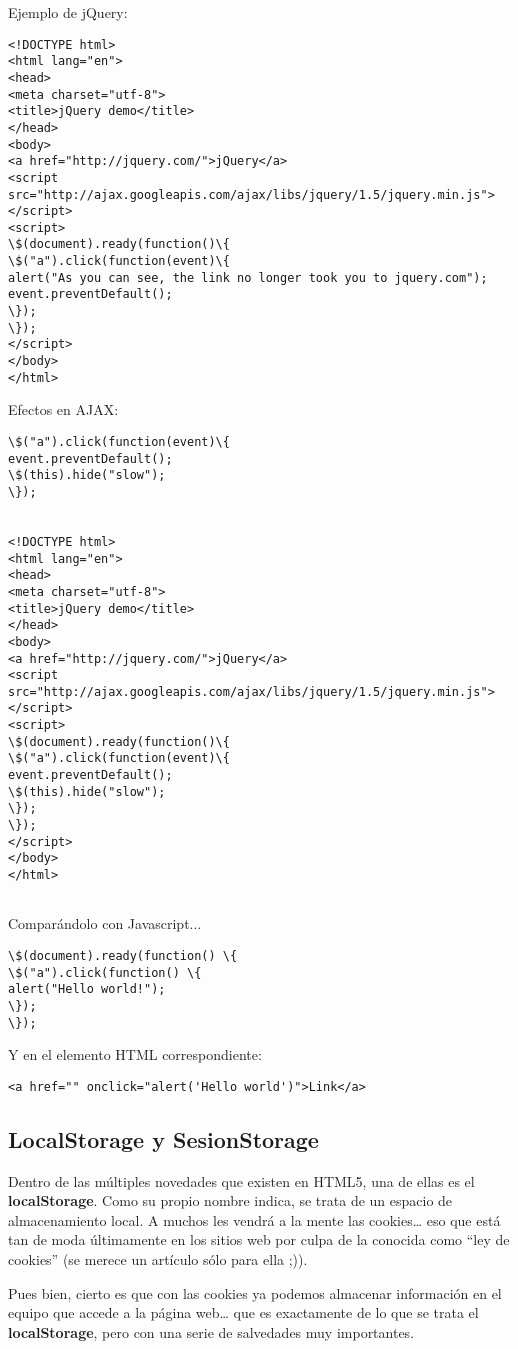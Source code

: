 \documentclass{apuntes}
\begin{document}
Ejemplo de jQuery:

\begin{verbatim}
<!DOCTYPE html>
<html lang="en">
<head>
<meta charset="utf-8">
<title>jQuery demo</title>
</head>
<body>
<a href="http://jquery.com/">jQuery</a>
<script src="http://ajax.googleapis.com/ajax/libs/jquery/1.5/jquery.min.js"></script>
<script>
\$(document).ready(function()\{
\$("a").click(function(event)\{
alert("As you can see, the link no longer took you to jquery.com");
event.preventDefault();
\});
\});
</script>
</body>
</html>
\end{verbatim}

Efectos en AJAX:
\begin{verbatim}
\$("a").click(function(event)\{
event.preventDefault();
\$(this).hide("slow");
\});


<!DOCTYPE html>
<html lang="en">
<head>
<meta charset="utf-8">
<title>jQuery demo</title>
</head>
<body>
<a href="http://jquery.com/">jQuery</a>
<script 
src="http://ajax.googleapis.com/ajax/libs/jquery/1.5/jquery.min.js"></script>
<script>
\$(document).ready(function()\{
\$("a").click(function(event)\{
event.preventDefault();
\$(this).hide("slow");
\});
\});
</script>
</body>
</html>


\end{verbatim}
Comparándolo con Javascript...
\begin{verbatim}
\$(document).ready(function() \{
\$("a").click(function() \{
alert("Hello world!");
\});
\});
\end{verbatim}
Y en el elemento HTML correspondiente:
\begin{verbatim}
<a href="" onclick="alert('Hello world')">Link</a>
\end{verbatim}

\subsection{LocalStorage y SesionStorage}
Dentro de las múltiples novedades que existen en HTML5, una de ellas es el \textbf{localStorage}. Como su propio nombre indica, se trata de un espacio de almacenamiento local. A muchos les vendrá a la mente las cookies… eso que está tan de moda últimamente en los sitios web por culpa de la conocida como “ley de cookies” (se merece un artículo sólo para ella ;)).

Pues bien, cierto es que con las cookies ya podemos almacenar información en el equipo que accede a la página web… que es exactamente de lo que se trata el \textbf{localStorage}, pero con una serie de salvedades muy importantes.
\end{document}
